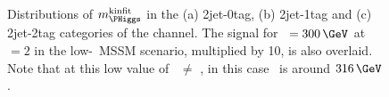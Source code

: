 \begin{figure}[h!]
\begin{center}
~\\
\end{center}
\caption[Distributions of $m_{\PHiggs}^{\text{kinfit}}$ in the 2jet-0tag,
2jet-1tag and 2jet-2tag categories of the \etau channel.]{Distributions of $m_{\PHiggs}^{\text{kinfit}}$ in the (a) 2jet-0tag, (b) 2jet-1tag and (c) 2jet-2tag categories 
of the \etau channel. The \Htohhtobbtautau signal for \mA~$= 300\,\GeV$ at \tanb~$=2$ in the low-\tanb~MSSM
scenario, multiplied by 10, is also overlaid. Note that at this low value of \tanb~\mA$\neq$ \mH, in 
this case \mH~is around $316\,\GeV$.}
\label{fig:hhh_results_mhkinfit_etau}
\end{figure}

